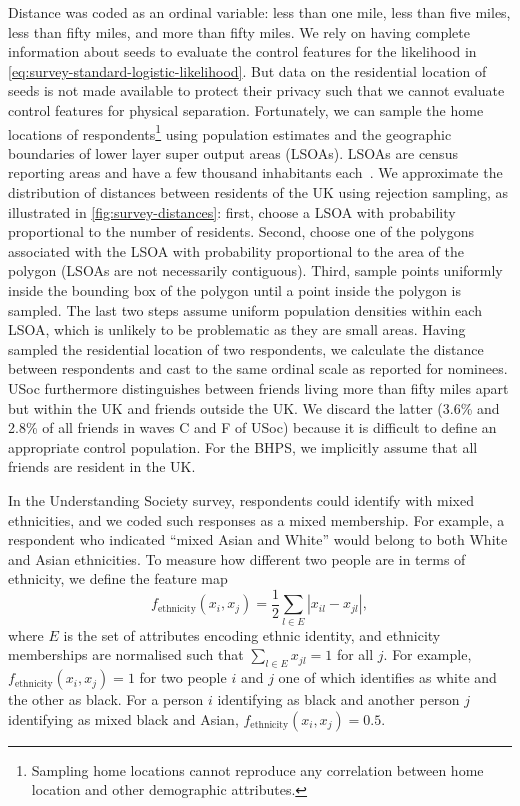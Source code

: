 \documentclass{scrartcl}
\newcommand{\abs}[1]{\left|#1\right|}
\begin{document}
Distance was coded as an ordinal variable: less than one mile, less than five miles, less than fifty miles, and more than fifty miles. We rely on having complete information about seeds to evaluate the control features for the likelihood in \cref{eq:survey-standard-logistic-likelihood}. But data on the residential location of seeds is not made available to protect their privacy such that we cannot evaluate control features for physical separation. Fortunately, we can sample the home locations of respondents\footnote{Sampling home locations cannot reproduce any correlation between home location and other demographic attributes.} using population estimates and the geographic boundaries of lower layer super output areas (LSOAs). LSOAs are census reporting areas and have a few thousand inhabitants each~\cite{Lsoas}. We approximate the distribution of distances between residents of the UK using rejection sampling, as illustrated in \cref{fig:survey-distances}: first, choose a LSOA with probability proportional to the number of residents. Second, choose one of the polygons associated with the LSOA with probability proportional to the area of the polygon (LSOAs are not necessarily contiguous). Third, sample points uniformly inside the bounding box of the polygon until a point inside the polygon is sampled. The last two steps assume uniform population densities within each LSOA, which is unlikely to be problematic as they are small areas. Having sampled the residential location of two respondents, we calculate the distance between respondents and cast to the same ordinal scale as reported for nominees. USoc furthermore distinguishes between friends living more than fifty miles apart but within the UK and friends outside the UK. We discard the latter (3.6\% and 2.8\% of all friends in waves C and F of USoc) because it is difficult to define an appropriate control population. For the BHPS, we implicitly assume that all friends are resident in the UK.

In the Understanding Society survey, respondents could identify with mixed ethnicities, and we coded such responses as a mixed membership. For example, a respondent who indicated ``mixed Asian and White'' would belong to both White and Asian ethnicities. To measure how different two people are in terms of ethnicity, we define the feature map
\[
    f_\text{ethnicity}(x_i, x_j) = \frac{1}{2} \sum_{l\in E}\abs{x_{il}-x_{jl}},
\]
where $E$ is the set of attributes encoding ethnic identity, and ethnicity memberships are normalised such that $\sum_{l\in E}x_{jl}=1$ for all $j$. For example, $f_\text{ethnicity}(x_i, x_j)=1$ for two people $i$ and $j$ one of which identifies as white and the other as black. For a person $i$ identifying as black and another person $j$ identifying as mixed black and Asian, $f_\text{ethnicity}(x_i, x_j)=0.5$.
\end{document}
